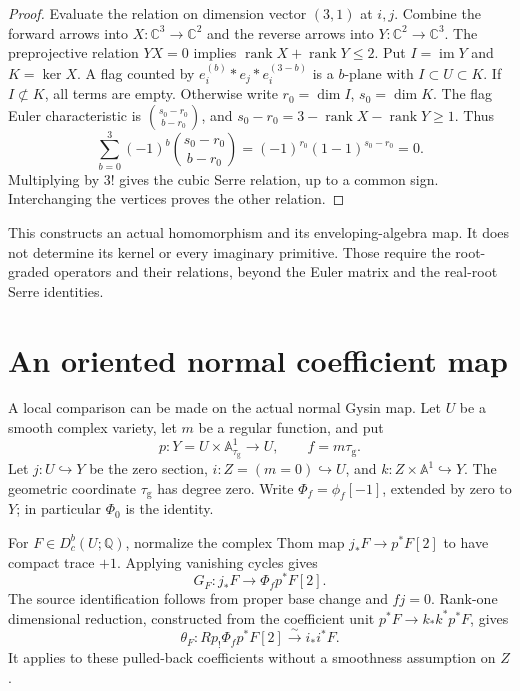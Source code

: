 \begin{proof}
Evaluate the relation on dimension vector $(3,1)$
at $i,j$. Combine the forward arrows into
$X:\mathbb C^3\to\mathbb C^2$ and the reverse arrows
into $Y:\mathbb C^2\to\mathbb C^3$.
The preprojective relation $YX=0$ implies
$\operatorname{rank}X+\operatorname{rank}Y\leq2$.
Put $I=\operatorname{im}Y$ and $K=\ker X$.
A flag counted by $e_i^{(b)}*e_j*e_i^{(3-b)}$
is a $b$-plane with $I\subset U\subset K$.
If $I\not\subset K$, all terms are empty.
Otherwise write $r_0=\dim I$, $s_0=\dim K$.
The flag Euler characteristic is
$\binom{s_0-r_0}{b-r_0}$, and
$s_0-r_0=3-\operatorname{rank}X-\operatorname{rank}Y\geq1$.
Thus
\[
 \sum_{b=0}^3(-1)^b\binom{s_0-r_0}{b-r_0}
 =(-1)^{r_0}(1-1)^{s_0-r_0}=0.
\]
Multiplying by $3!$ gives the cubic Serre relation,
up to a common sign. Interchanging the vertices
proves the other relation.
\end{proof}

This constructs an actual homomorphism and its
enveloping-algebra map. It does not determine its
kernel or every imaginary primitive. Those require
the root-graded operators and their relations,
beyond the Euler matrix and the real-root Serre
identities.

\section{An oriented normal coefficient map}
\label{cycompact:sec:normal}

A local comparison can be made on the actual normal
Gysin map. Let $U$ be a smooth complex variety, let $m$
be a regular function, and put
\[
 p:Y=U\times\mathbb A^1_{\tau_{\mathrm g}}\to U,
 \qquad f=m\tau_{\mathrm g}.
\]
Let $j:U\hookrightarrow Y$ be the zero section,
$i:Z=(m=0)\hookrightarrow U$, and
$k:Z\times\mathbb A^1\hookrightarrow Y$.
The geometric coordinate $\tau_{\mathrm g}$ has degree
zero. Write $\Phi_f=\phi_f[-1]$, extended by zero to
$Y$; in particular $\Phi_0$ is the identity.

For $F\in D_c^b(U;\mathbb Q)$, normalize the complex
Thom map $j_*F\to p^*F[2]$ to have compact trace $+1$.
Applying vanishing cycles gives
\begin{equation}\label{cycompact:eq:normal-Gysin}
 G_F:j_*F\longrightarrow\Phi_fp^*F[2].
\end{equation}
The source identification follows from proper base change
and $fj=0$. Rank-one dimensional reduction, constructed
from the coefficient unit $p^*F\to k_*k^*p^*F$, gives
\[
 \theta_F:Rp_!\Phi_fp^*F[2]\xrightarrow{\sim}i_*i^*F.
\]
It applies to these pulled-back coefficients without a
smoothness assumption on $Z$.

